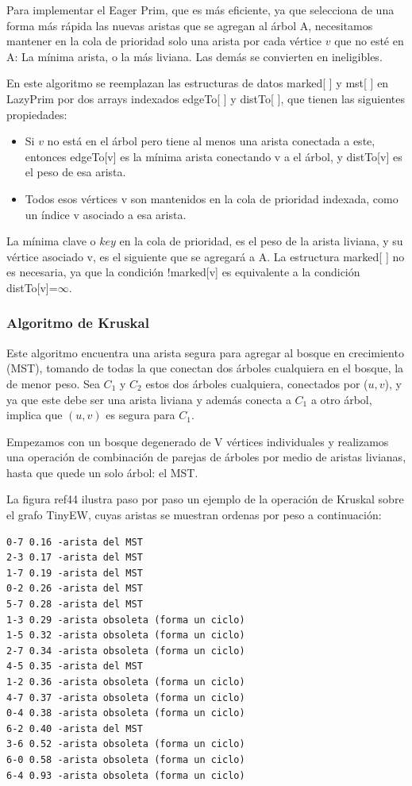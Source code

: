 \documentclass[a4paper, 11pt]{report}
\begin{document}
Para implementar el Eager Prim, que es más eficiente, ya que selecciona de una forma más rápida las nuevas aristas que se agregan al árbol A, necesitamos mantener en la cola de prioridad solo una arista por cada vértice $v$ que no esté en A: La mínima arista, o la más liviana. Las demás se convierten en ineligibles.

En este algoritmo se reemplazan las estructuras de datos marked[ ] y mst[ ] en LazyPrim por dos arrays indexados edgeTo[ ] y distTo[ ], que tienen las siguientes propiedades:

\begin{itemize}
\item Si $v$ no está en el árbol pero tiene al menos una arista conectada a este, entonces edgeTo[v] es la mínima arista conectando v a el árbol, y distTo[v] es el peso de esa arista.
\item Todos esos vértices v son mantenidos en la cola de prioridad indexada, como un índice v asociado a esa arista.
\end{itemize} 
La mínima clave o $key$ en la cola de prioridad, es el peso de la arista liviana, y su vértice asociado v, es el siguiente que se agregará a A. La estructura marked[ ] no es necesaria, ya que la condición !marked[v] es equivalente a la condición distTo[v]=$\infty$.   

\subsubsection{Algoritmo de Kruskal}
Este algoritmo encuentra una arista segura para agregar al bosque en crecimiento (MST), tomando de todas la que conectan dos árboles cualquiera en el bosque, la de menor peso. Sea $C_1$ y $C_2$ estos dos árboles cualquiera, conectados por ($u, v$), y ya que este debe ser una arista liviana y además conecta a $C_1$ a otro árbol, implica que $(u, v)$ es segura para $C_1$. 

Empezamos con un bosque degenerado de V vértices individuales y realizamos una operación de combinación de parejas de árboles por medio de aristas livianas, hasta que quede un solo árbol: el MST.

La figura ref44 ilustra paso por paso un ejemplo de la operación de Kruskal sobre el grafo TinyEW, cuyas aristas se muestran ordenas por peso a continuación: 

\begin{verbatim}
0-7 0.16 -arista del MST
2-3 0.17 -arista del MST
1-7 0.19 -arista del MST
0-2 0.26 -arista del MST
5-7 0.28 -arista del MST
1-3 0.29 -arista obsoleta (forma un ciclo)
1-5 0.32 -arista obsoleta (forma un ciclo)
2-7 0.34 -arista obsoleta (forma un ciclo)
4-5 0.35 -arista del MST
1-2 0.36 -arista obsoleta (forma un ciclo)
4-7 0.37 -arista obsoleta (forma un ciclo)
0-4 0.38 -arista obsoleta (forma un ciclo)
6-2 0.40 -arista del MST
3-6 0.52 -arista obsoleta (forma un ciclo)
6-0 0.58 -arista obsoleta (forma un ciclo)
6-4 0.93 -arista obsoleta (forma un ciclo)
\end{verbatim}
\end{document}
